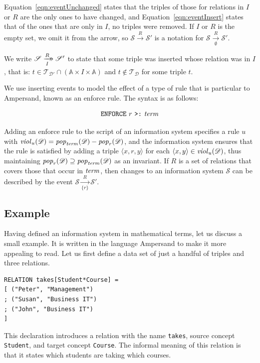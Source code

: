 \documentclass[runningheads]{llncs}
\newcommand{\xrightarrowdbl}[2][]{%
  \xrightarrow[#1]{#2}\mathrel{\mkern-14mu}\rightarrow
}
\newcommand{\id}[1]{\text{\it #1\/}}
\newcommand{\pop}[2]{\id{pop}_{#1}(#2)}
\newcommand{\viol}[2]{\violC{#1}(#2)}
\newcommand{\violC}[1]{\id{viol}_{#1}}
\newcommand{\pair}[2]{\langle{#1},{#2}\rangle}
\newcommand{\triple}[3]{\langle{#1},{#2},{#3}\rangle}
\newcommand{\Atoms}{\mathbb{A}}
\newcommand{\triples}{\mathcal{T}}
\newcommand{\Triple}[3]{#1\times#2\times#3}
\newcommand{\dataset}{\mathscr{D}}
\newcommand{\infsys}{\mathscr{S}}
\begin{document}
   Equation~\ref{eqn:eventUnchanged} states that the triples of those for relations in $I$ or $R$ are the only ones to have changed, and Equation~\ref{eqn:eventInsert} states that of the ones that are only in $I$, no triples were removed.
   If $I$ or $R$ is the empty set, we omit it from the arrow, so $\infsys \xrightarrow{R} \infsys'$ is a notation for $\infsys \xrightarrow[\emptyset]{R} \infsys'$.
   
   \begin{definition}
   We write $\infsys \xrightarrowdbl[I]{R} \infsys'$ to state that some triple was inserted whose relation was in $I$, that is:
   $t \in \triples_{\dataset'} \cap (\Triple{\Atoms}{I}{\Atoms})$ and $t \not\in \triples_{\dataset}$ for some triple $t$.
   \end{definition}
   
   We use inserting events to model the effect of a type of rule that is particular to Ampersand, known as an enforce rule.
   The syntax is as follows:
   
\begin{align}
      \text{\tt ENFORCE}\ r\ \text{\tt >:}\ \id{term}\label{enforce ins}
\end{align}

   Adding an enforce rule to the script of an information system specifies a rule $u$ with $\viol{u}{\dataset} = \pop{\id{term}}{\dataset} - \pop{r}{\dataset}$, and the information system ensures that the rule is satisfied by adding a triple $\triple{x}{r}{y}$ for each $\pair{x}{y} \in \viol{u}{\dataset}$, thus maintaining $\pop{r}{\dataset} \supseteq \pop{\id{term}}{\dataset}$ as an invariant.
   If $R$ is a set of relations that covers those that occur in $\id{term}$, then changes to an information system $\infsys$ can be described by the event $\infsys \xrightarrow[\{r\}]{R} \infsys'$.

\subsection{Example}
\label{sct:Example existing IS}
   Having defined an information system in mathematical terms, let us discuss a small example.
   It is written in the language Ampersand to make it more appealing to read.
   Let us first define a data set of just a handful of triples and three relations.
\begin{verbatim}
RELATION takes[Student*Course] =
[ ("Peter", "Management")
; ("Susan", "Business IT")
; ("John", "Business IT")
]
\end{verbatim}
   This declaration introduces a relation with the name \verb#takes#,
   source concept \verb#Student#, and
   target concept \verb#Course#.
   The informal meaning of this relation is that it states which students are taking which courses.
\end{document}
